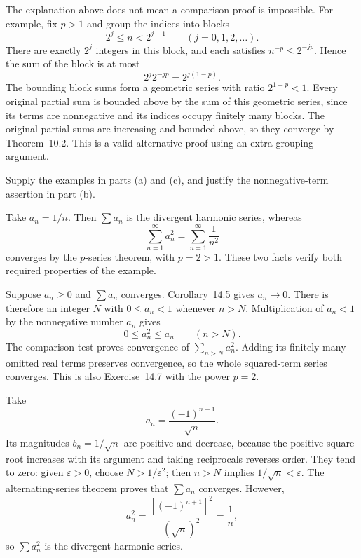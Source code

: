 The explanation above does not mean a comparison proof is impossible.
For example, fix $p>1$ and group the indices into blocks
\[
 2^j\le n<2^{j+1}\qquad(j=0,1,2,\ldots).
\]
There are exactly $2^j$ integers in this block, and each satisfies
$n^{-p}\le2^{-jp}$. Hence the sum of the block is at most
\[
 2^j2^{-jp}=2^{j(1-p)}.
\]
The bounding block sums form a geometric series with ratio
$2^{1-p}<1$. Every original partial sum is bounded above by the
sum of this geometric series, since its terms are nonnegative and
its indices occupy finitely many blocks. The original partial sums
are increasing and bounded above, so they converge by Theorem~10.2.
This is a valid alternative proof using an extra grouping argument.

\goal Supply the examples in parts (a) and (c), and justify the
nonnegative-term assertion in part (b).

Take $a_n=1/n$. Then $\sum a_n$ is the divergent harmonic series,
whereas
\[
 \sum_{n=1}^{\infty}a_n^2
 =\sum_{n=1}^{\infty}\frac1{n^2}
\]
converges by the $p$-series theorem, with $p=2>1$.
These two facts verify both required properties of the example.

Suppose $a_n\ge0$ and $\sum a_n$ converges. Corollary~14.5 gives
$a_n\to0$. There is therefore an integer $N$ with $0\le a_n<1$
whenever $n>N$. Multiplication of $a_n<1$ by the nonnegative
number $a_n$ gives
\[
 0\le a_n^2\le a_n\qquad(n>N).
\]
The comparison test proves convergence of $\sum_{n>N}a_n^2$.
Adding its finitely many omitted real terms preserves convergence,
so the whole squared-term series converges. This is also
Exercise~14.7 with the power $p=2$.

Take
\[
 a_n=\frac{(-1)^{n+1}}{\sqrt n}.
\]
Its magnitudes $b_n=1/\sqrt n$ are positive and decrease, because
the positive square root increases with its argument and taking
reciprocals reverses order. They tend to zero: given
$\varepsilon>0$, choose $N>1/\varepsilon^2$; then $n>N$
implies $1/\sqrt n<\varepsilon$.
The alternating-series theorem proves that $\sum a_n$ converges.
However,
\[
 a_n^2=\frac{[(-1)^{n+1}]^2}{(\sqrt n)^2}=\frac1n,
\]
so $\sum a_n^2$ is the divergent harmonic series.

